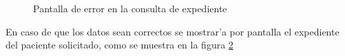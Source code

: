 \begin{enumerate}
\begin{itemize}
\begin{figure}[h!]
	\begin{center}
     	\end{center}
    	\caption{Pantalla de error en la consulta de expediente}\label{fig:error_consulta}
\end{figure}

En caso de que los datos sean correctos se mostrar'a por pantalla el expediente del paciente solicitado, como se muestra en la figura \ref{fig:expediente}

\begin{figure}[h!]
	\begin{center}
     	\end{center}
    	\caption{}\label{fig:expediente}
\end{figure}


\end{itemize}
\end{enumerate}
